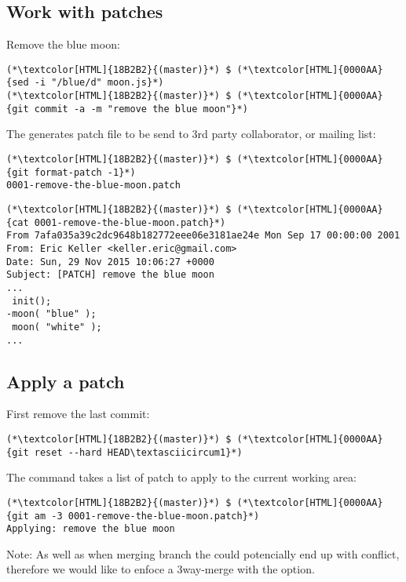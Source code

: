 \subsection{Work with patches}
\begin{frame}[fragile]
    \subslidetitle

  Remove the blue moon:
  \begin{lstlisting}
(*\textcolor[HTML]{18B2B2}{(master)}*) $ (*\textcolor[HTML]{0000AA}{sed -i "/blue/d" moon.js}*)
(*\textcolor[HTML]{18B2B2}{(master)}*) $ (*\textcolor[HTML]{0000AA}{git commit -a -m "remove the blue moon"}*)
\end{lstlisting}

  The  generates patch file to be send to 3rd party collaborator, or mailing list:
  \begin{lstlisting}
(*\textcolor[HTML]{18B2B2}{(master)}*) $ (*\textcolor[HTML]{0000AA}{git format-patch -1}*)
0001-remove-the-blue-moon.patch
\end{lstlisting}

  \begin{lstlisting}
(*\textcolor[HTML]{18B2B2}{(master)}*) $ (*\textcolor[HTML]{0000AA}{cat 0001-remove-the-blue-moon.patch}*)
From 7afa035a39c2dc9648b182772eee06e3181ae24e Mon Sep 17 00:00:00 2001
From: Eric Keller <keller.eric@gmail.com>
Date: Sun, 29 Nov 2015 10:06:27 +0000
Subject: [PATCH] remove the blue moon
...
 init();
-moon( "blue" );
 moon( "white" );
...
\end{lstlisting}

\end{frame}

\subsection{Apply a patch}
\begin{frame}[fragile]
    \subslidetitle
  First remove the last commit:
  \begin{lstlisting}
(*\textcolor[HTML]{18B2B2}{(master)}*) $ (*\textcolor[HTML]{0000AA}{git reset --hard HEAD\textasciicircum1}*)
\end{lstlisting}
  The  command takes a list of patch to apply to the current working area:
  \begin{lstlisting}
(*\textcolor[HTML]{18B2B2}{(master)}*) $ (*\textcolor[HTML]{0000AA}{git am -3 0001-remove-the-blue-moon.patch}*)
Applying: remove the blue moon
\end{lstlisting}

  Note: As well as when merging branch the  could potencially end up with conflict, therefore we would like to enfoce a 3way-merge with the  option.

\end{frame}

